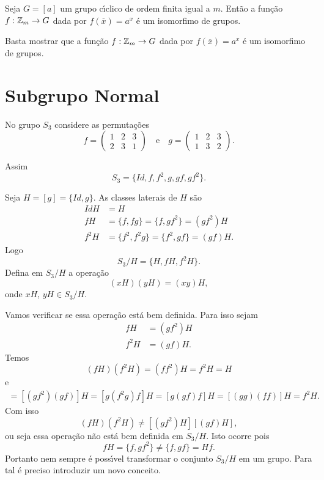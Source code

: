 \begin{corolario}
    Seja $G = [a]$ um grupo c{\'\i}clico de ordem finita igual a $m$. Ent\~ao a fun\c{c}\~ao $f : \mathbb{Z}_m \to G$ dada por $f(\overline{x}) = a^x$ \'e um isomorfimo de grupos.
\end{corolario}
\begin{prova}
	Basta mostrar que a fun\c{c}\~ao $f : \mathbb{Z}_m \to G$ dada por $f(\overline{x}) = a^x$ \'e um isomorfimo de grupos.
\end{prova}

\section{Subgrupo Normal} %
\label{sec:subgrupo_normal}

No grupo $S_3$ considere as permuta\c{c}\~oes
\[
	f = \begin{pmatrix}
		1 & 2 & 3\\
		2 & 3 & 1
	\end{pmatrix} \quad \mbox{e}\quad
	g = \begin{pmatrix}
		1 & 2 & 3\\
		1 & 3 & 2
	\end{pmatrix}.
\]

Assim
\[
	S_3 = \{Id, f, f^2, g, gf, gf^2\}.
\]

Seja $H = [g] = \{Id, g\}$. As classes laterais de $H$ s\~ao
\begin{align*}
	IdH &= H\\
	fH &= \{f, fg\} = \{f, gf^2\} = (gf^2)H\\
	f^2H &= \{f^2, f^2g\} = \{f^2, gf\} = (gf)H.
\end{align*}
Logo
\[
	S_3/H = \{H, fH, f^2H\}.
\]
Defina em $S_3/H$ a opera\c{c}\~ao
\[
	(xH)(yH) = (xy)H,
\]
onde $xH$, $yH \in S_3/H$.

Vamos verificar se essa opera\c{c}\~ao est\'a bem definida. Para isso sejam
\begin{align*}
	fH &= (gf^2)H\\
	f^2H &= (gf)H.
\end{align*}
Temos
\[
	(fH)(f^2H) = (ff^2)H = f^2H = H
\]
e
\begin{align*}
	[(gf^2)H][(gf)H] = [(gf^2)(gf)]H = [g(f^2g)f]H = [g(gf)f]H = [(gg)(ff)]H = f^2H.
\end{align*}
Com isso
\[
	(fH)(f^2H) \ne [(gf^2)H][(gf)H],
\]
ou seja essa opera\c{c}\~ao n\~ao est\'a bem definida em $S_3/H$. Isto ocorre pois
\[
	fH = \{f, gf^2\} \ne \{f, gf\} = Hf.
\]
Portanto nem sempre \'e poss{\'\i}vel transformar o conjunto $S_3/H$ em um grupo. Para tal \'e preciso introduzir um novo conceito.


